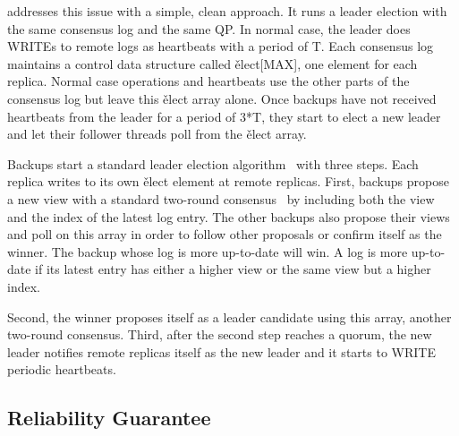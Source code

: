 

\xxx addresses this issue with a simple, clean approach. It runs a leader 
election with the same consensus log and the same QP. In normal case, the 
leader does WRITEs to remote logs as heartbeats with a period of T. Each 
consensus log maintains a control data structure called \v{elect[MAX]}, one 
element for each replica. Normal case operations and heartbeats use the other 
parts of the consensus log but leave this \v{elect} array alone. Once backups 
have not received heartbeats from the leader for a period of 3*T, they start to 
elect a new leader and let their follower threads poll from the \v{elect} array.


Backups start a standard \paxos leader election 
algorithm~\cite{paxos:practical} with three steps. Each replica writes to its 
own \v{elect} element at remote replicas. First, backups propose a new view 
with a standard two-round \paxos consensus~\cite{paxos:simple} by including 
both the view and the index of the latest log entry. The other backups also 
propose their views and poll on this array in order to follow other proposals 
or confirm itself as the winner. The backup whose log is more up-to-date will 
win. A log is more up-to-date if its latest entry has either a higher view or 
the same view but a higher index.

Second, the winner proposes itself as a leader candidate using this 
array, another two-round \paxos consensus. Third, after the second step reaches 
a quorum, the new leader notifies remote replicas itself as the new leader and 
it starts to WRITE periodic heartbeats.

\subsection{Reliability Guarantee} \label{sec:guarantees}

